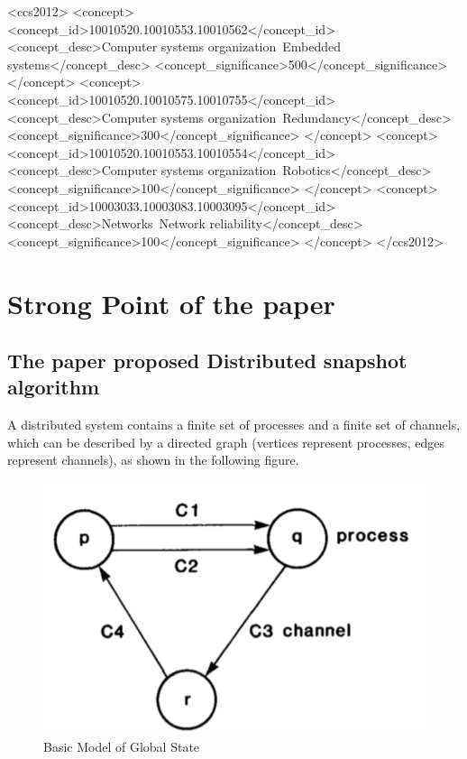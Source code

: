 \documentclass[acmlarge]{acmart}
\begin{document}
\begin{CCSXML}
  <ccs2012>
  <concept>
  <concept_id>10010520.10010553.10010562</concept_id>
  <concept_desc>Computer systems organization~Embedded systems</concept_desc>
  <concept_significance>500</concept_significance>
  </concept>
  <concept>
  <concept_id>10010520.10010575.10010755</concept_id>
  <concept_desc>Computer systems organization~Redundancy</concept_desc>
  <concept_significance>300</concept_significance>
  </concept>
  <concept>
  <concept_id>10010520.10010553.10010554</concept_id>
  <concept_desc>Computer systems organization~Robotics</concept_desc>
  <concept_significance>100</concept_significance>
  </concept>
  <concept>
  <concept_id>10003033.10003083.10003095</concept_id>
  <concept_desc>Networks~Network reliability</concept_desc>
  <concept_significance>100</concept_significance>
  </concept>
  </ccs2012>
\end{CCSXML}




\maketitle

\section{Strong Point of the paper}
\subsection{The paper proposed Distributed snapshot algorithm}
A distributed system contains a finite set of processes and a finite set of channels, which can be described by a directed graph (vertices represent processes, edges represent channels), as shown in the following figure.

\begin{figure}[h]
  \centering
  \includegraphics[width=0.3\linewidth]{./distributed_graph.png}
  \caption{Basic Model of Global State}
\end{figure}
\end{document}
